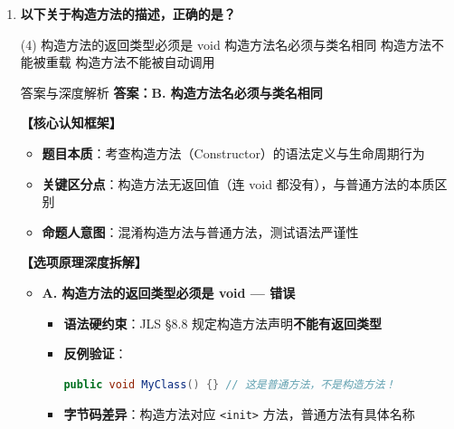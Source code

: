 ﻿\documentclass[12pt, a4paper]{ctexart}
\newcommand{\code}[1]{\texttt{#1}}
\begin{document}
\begin{enumerate}[label=\textbf{\arabic*.}, itemsep=1em]
\begin{bluebox}{答案与深度解析}
		      \textbf{【应背诵知识点（命题人思维版）】}
		      \begin{enumerate}[leftmargin=*, nosep]
			      \item \textbf{Java 保留字清单}：共 50+ 个，不含 \code{virtual}, \code{goto} (保留但未使用), \code{const} (保留但未使用)
			      \item \textbf{多态实现差异}：Java 默认虚方法 vs C++ 显式虚函数
		      \end{enumerate}

		      \textbf{【命题趋势与实战策略】}
		      \begin{itemize}[leftmargin=*, nosep]
			      \item \textbf{考场秒杀}：见到 \code{virtual} 直接选，Java 里没有
			      \item \textbf{高频陷阱}：\code{goto} 和 \code{const} 是保留字但不是有效关键字
		      \end{itemize}
	      \end{bluebox}

	\item \textbf{以下关于构造方法的描述，正确的是？}
	      \begin{tasks}(4)
		      \task 构造方法的返回类型必须是 void
		      \task 构造方法名必须与类名相同
		      \task 构造方法不能被重载
		      \task 构造方法不能被自动调用
	      \end{tasks}

	      \begin{bluebox}{答案与深度解析}
		      \textbf{答案：B. 构造方法名必须与类名相同}

		      \textbf{【核心认知框架】}
		      \begin{itemize}[leftmargin=*, nosep]
			      \item \textbf{题目本质}：考查构造方法（Constructor）的语法定义与生命周期行为
			      \item \textbf{关键区分点}：构造方法无返回值（连 void 都没有），与普通方法的本质区别
			      \item \textbf{命题人意图}：混淆构造方法与普通方法，测试语法严谨性
		      \end{itemize}

		      \textbf{【选项原理深度拆解】}
		      \begin{itemize}[leftmargin=*, nosep]
			      \item \textbf{A. 构造方法的返回类型必须是 void — 错误}
			            \begin{itemize}[leftmargin=*, nosep]
				            \item \textbf{语法硬约束}：JLS §8.8 规定构造方法声明\textbf{不能有返回类型}
				            \item \textbf{反例验证}：
				                  \begin{lstlisting}[language=Java]
public void MyClass() {} // 这是普通方法，不是构造方法！
            \end{lstlisting}
				            \item \textbf{字节码差异}：构造方法对应 \code{<init>} 方法，普通方法有具体名称
			            \end{itemize}


\end{itemize}
\end{bluebox}
\end{enumerate}
\end{document}
